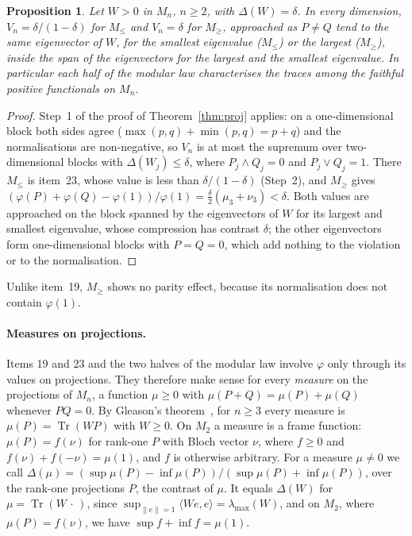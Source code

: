 \documentclass[11pt]{article}
\DeclareMathOperator{\Tr}{Tr}
\theoremstyle{plain}
\newtheorem{proposition}[theorem]{Proposition}
\theoremstyle{definition}
\theoremstyle{remark}
\begin{document}
\begin{proposition}\label{prop:modular}
Let $W>0$ in $M_n$, $n\ge2$, with $\Delta(W)=\delta$. In every dimension, $V_n=\delta/(1-\delta)$ for $M_\le$ and
$V_n=\delta$ for $M_\ge$, approached as $P\ne Q$ tend to the same eigenvector of $W$, for the smallest eigenvalue ($M_\le$)
or the largest ($M_\ge$), inside the span of the eigenvectors for the largest and the smallest eigenvalue. In particular
each half of the modular law characterises the traces among the faithful positive functionals on $M_n$.
\end{proposition}
\begin{proof}
Step~1 of the proof of Theorem~\ref{thm:proj} applies: on a one-dimensional block both sides agree
($\max(p,q)+\min(p,q)=p+q$) and the normalisations are non-negative, so $V_n$ is at most the supremum over two-dimensional
blocks with $\Delta(W_j)\le\delta$, where $P_j\wedge Q_j=0$ and $P_j\vee Q_j=1$. There $M_\le$ is item~23, whose value is
less than $\delta/(1-\delta)$ (Step~2), and $M_\ge$ gives $(\varphi(P)+\varphi(Q)-\varphi(1))/\varphi(1)=\frac\delta2(\mu_3+\nu_3)
<\delta$. Both values are approached on the block spanned by the eigenvectors of $W$ for its largest and smallest
eigenvalue, whose compression has contrast $\delta$; the other eigenvectors form one-dimensional blocks with $P=Q=0$,
which add nothing to the violation or to the normalisation.
\end{proof}

\noindent Unlike item~19, $M_\ge$ shows no parity effect, because its normalisation does not contain $\varphi(1)$.

\paragraph{Measures on projections.} Items 19 and 23 and the two halves of the modular law involve $\varphi$ only through
its values on projections. They therefore make sense for every \emph{measure} on the projections of $M_n$, a function
$\mu\ge0$ with $\mu(P+Q)=\mu(P)+\mu(Q)$ whenever $PQ=0$. By Gleason's theorem~\cite{gleason1957}, for $n\ge3$ every
measure is $\mu(P)=\Tr(WP)$ with $W\ge0$. On $M_2$ a measure is a frame function: $\mu(P)=f(\nu)$ for rank-one $P$ with
Bloch vector $\nu$, where $f\ge0$ and $f(\nu)+f(-\nu)=\mu(1)$, and $f$ is otherwise arbitrary. For a measure $\mu\ne0$
we call $\Delta(\mu)=(\sup\mu(P)-\inf\mu(P))/(\sup\mu(P)+\inf\mu(P))$, over the rank-one projections $P$, the
contrast of $\mu$. It equals $\Delta(W)$ for $\mu=\Tr(W\,\cdot\,)$, since $\sup_{\|e\|=1}\langle We,e\rangle=\lambda_{\max}(W)$,
and on $M_2$, where $\mu(P)=f(\nu)$, we have $\sup f+\inf f=\mu(1)$.
\end{document}
